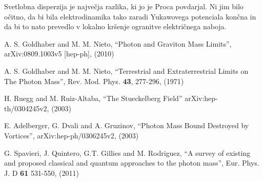 \documentclass[a4paper, twocolumn, titlepage]{article}
\begin{document}
Svetlobna disperzija je najve\v cja razlika, ki jo je Proca povdarjal. Ni jim bilo o\v citno, da bi bila elektrodinamika
tako zaradi Yukawovega potenciala kon\v cna in da bi to nato prevedlo v lokalno kr\v senje ogranitve elektri\v cnega
naboja.



\begin{thebibliography}{9}
	A. S. Goldhaber and M. M. Nieto,
	"`Photon and Graviton Mass Limits"',
	arXiv:0809.1003v5 [hep-ph],
	(2010)

	A. S. Goldhaber and M. M. Nieto,
	"`Terrestrial and Extraterrestrial Limits on The Photon Mass"',
	Rev. Mod. Phys. {\bf 43}, 277-296,
	(1971)

	H. Ruegg and M. Ruiz-Altaba,
	"`The Stueckelberg Field"'
	arXiv:hep-th/0304245v2,
	(2003)

	E. Adelberger, G. Dvali and A. Gruzinov,
	"`Photon Mass Bound Destroyed by Vortices"',
	arXiv:hep-ph/0306245v2,
	(2003)

	G. Spavieri, J. Quintero, G.T. Gillies and M. Rodriguez,
	"`A survey of existing and proposed classical and quantum approaches to the photon mass"',
	Eur. Phys. J. D {\bf 61} 531-550,
	(2011)
\end{thebibliography}
\end{document}
